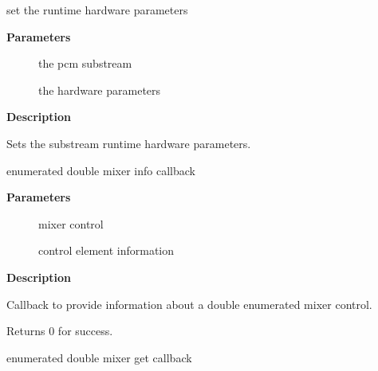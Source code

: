 \documentclass[a4paper,8pt,english]{sphinxmanual}
\begin{document}
\begin{fulllineitems}
\label{sound/kernel-api/alsa-driver-api:c.snd_soc_set_runtime_hwparams}
set the runtime hardware parameters

\end{fulllineitems}


\textbf{Parameters}
\begin{description}
\item[{}] \leavevmode
the pcm substream

\item[{}] \leavevmode
the hardware parameters

\end{description}

\textbf{Description}

Sets the substream runtime hardware parameters.

\begin{fulllineitems}
\label{sound/kernel-api/alsa-driver-api:c.snd_soc_info_enum_double}
enumerated double mixer info callback

\end{fulllineitems}


\textbf{Parameters}
\begin{description}
\item[{}] \leavevmode
mixer control

\item[{}] \leavevmode
control element information

\end{description}

\textbf{Description}

Callback to provide information about a double enumerated
mixer control.

Returns 0 for success.

\begin{fulllineitems}
\label{sound/kernel-api/alsa-driver-api:c.snd_soc_get_enum_double}
enumerated double mixer get callback

\end{fulllineitems}
\end{document}
